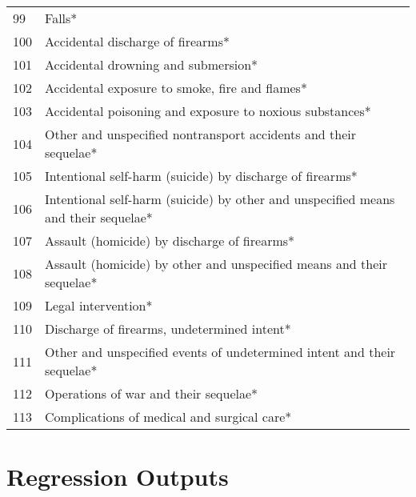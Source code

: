 \documentclass{article}
\begin{document}
\begin{center}
\begin{longtable}{|l|l|}
99&	Falls*\\
100&	Accidental discharge of firearms*\\
101	&Accidental drowning and submersion*\\
102	&Accidental exposure to smoke, fire and flames*\\
103&	Accidental poisoning and exposure to noxious substances*\\
104	&Other and unspecified nontransport accidents and their sequelae*\\
105&	Intentional self-harm (suicide) by discharge of firearms*\\
106	&Intentional self-harm (suicide) by other and unspecified means and their sequelae*\\
107	&Assault (homicide) by discharge of firearms*\\
108&	Assault (homicide) by other and unspecified means and their sequelae*\\
109&	Legal intervention*\\
110&	Discharge of firearms, undetermined intent*\\
111&	Other and unspecified events of undetermined intent and their sequelae*\\
112&	Operations of war and their sequelae*\\
113&	Complications of medical and surgical care*\\
\end{longtable}
\end{center}

\clearpage
\section{Regression Outputs}
\end{document}
